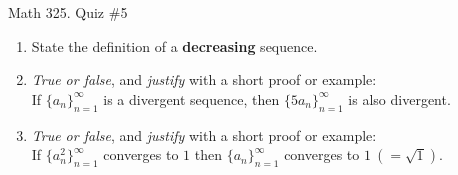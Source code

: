 \documentclass[12pt]{amsart}
\begin{document}
	
	\thispagestyle{empty}
	
	\begin{center}
		\Large{Math 325. Quiz \#5 }\\

	\end{center}
	
	
	
	\bigskip
	
	\begin{enumerate}
	
	\item State the definition of a \textbf{decreasing} sequence. 
	
		
	\vfill\vfill
	

	\item  \emph{True or false}, and \emph{justify} with a short proof or example:\\
If $\{a_n\}_{n=1}^\infty$ is a divergent sequence, then $\{5 a_n\}_{n=1}^\infty$ is also divergent.


\vfill\vfill\vfill 


\item  \emph{True or false}, and \emph{justify} with a short proof or example:\\
If $\{a_n^2\}_{n=1}^\infty$ converges to $1$ then $\{a_n\}_{n=1}^\infty$ converges to $1 \ (= \sqrt{1})$.
		
\vfill\vfill\vfill





\end{enumerate}

%
	
	
\end{document}
